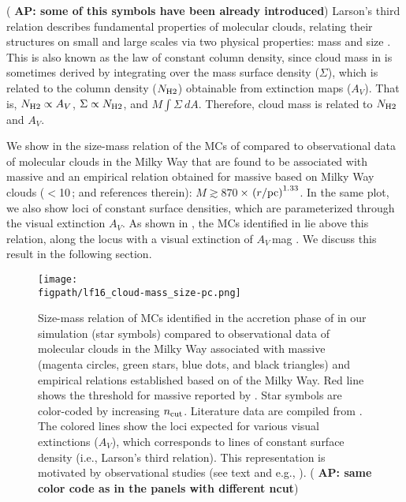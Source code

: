 \IfFileExists{emulateapjlegacy.cls}{\documentclass[iop]{emulateapjlegacy}}{\documentclass[iop]{emulateapj}}
\newcommand{\AP}[1]{({\bf \color{apcolor} AP: #1})}
\def\figpath{./Fig}
\begin{document}
\AP{some of this symbols have been already introduced} Larson's third relation describes fundamental properties of molecular clouds, relating their structures on small and large scales via two physical properties: mass and size \citep{Larson81a, McKee07a}. This is also known as the law of constant column density, since cloud mass in \obs is sometimes derived by integrating over the mass surface density ($\Sigma$), which is related to the column density ($N_{\rm H2}$) obtainable from extinction maps ($A_V$). That is, $N_{\rm H2}\propto A_V$, $\Sigma\propto N_{\rm H2}$, and $M$\eq$\int \Sigma~dA$. Therefore, cloud mass is related to $N_{\rm H2}$ and $A_V$.

We show in  the size-mass relation of the MCs of \flower compared to observational data of molecular clouds in the Milky Way that are found to be associated with massive \SF \citep{Beuther02a, Mueller02a, Hill05a, Motte07a} and an empirical relation obtained for massive \SF based on Milky Way clouds ($<$10\,\Msun; \citealt{Kauffmann10b, Kauffmann10c} and references therein): $M \gtrsim 870$\,\Msun$\times\,\left(r/{\rm pc}\right)^{1.33}$.
%
In the same plot, we also show loci of constant surface densities, which are parameterized through the visual extinction $A_V$. As shown in , the MCs identified in \flower lie above this relation, along the locus with a visual extinction of $A_V$\,mag \citep{Lombardi10a}. We discuss this result in the following section.

\begin{figure*}[htbp]
\centering
\texttt{[image: \\figpath/lf16\_cloud-mass\_size-pc.png]}
\caption{
Size-mass relation of MCs identified in the accretion phase of \flower in our simulation (star symbols) compared to observational data of molecular clouds in the Milky Way associated with massive \SF (magenta circles, green stars, blue dots, and black triangles) and empirical relations established based on \obs of the Milky Way. Red line shows the threshold for massive \SF reported by \citet{Kauffmann10b}. Star symbols are color-coded by increasing $n_{\rm cut}$. Literature data are compiled from \citet{Beuther02a, Mueller02a, Hill05a, Motte07a}. The colored lines show the loci expected for various visual extinctions ($A_V$), which corresponds to lines of constant surface density (i.e., Larson's third relation). This representation is motivated by observational studies (see text and e.g., \citealt{Lombardi10a}).
\AP{same color code as in the panels with different ncut}
\label{fig:MR}}
\end{figure*}
\end{document}

